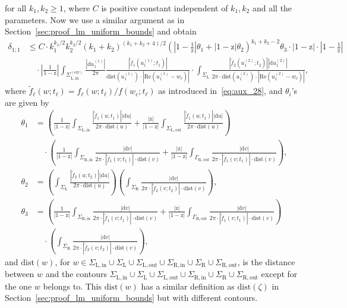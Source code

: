 \documentclass{article}
\numberwithin{equation}{section}
\newcommand{\dtt}{\text{dist}}
\newcommand{\exe}{\mathrm{err}}
\newcommand{\inn}{\mathrm{in}}
\newcommand{\LL}{\mathrm{L}}
\newcommand{\out}{\mathrm{out}}
\newcommand{\RR}{\mathrm{R}}
\begin{document}
for all $k_1,k_2\ge 1$, where $C$ is positive constant independent of  $k_1,k_2$ and all the parameters. Now we use a similar argument as in Section~\ref{sec:proof_lm_uniform_bounds} and obtain
\begin{equation}
	\label{eq:aux_29}
	\begin{split}
	\delta_{1;1}&\le C\cdot k_1^{k_1/2}k_2^{k_2/2}(k_1+k_2)^{(k_1+k_2+4)/2}\left(\left|1-\frac{1}{\mathrm{z}}\right|\theta_{1}+\left|1-\mathrm{z}\right|\theta_{2}\right)^{k_1+k_2-2} \theta_{3} \cdot |1-\mathrm{z}|\cdot\left|1-\frac{1}{\mathrm{z}}\right| \\
	&\quad\cdot \left|\frac{1}{1-\mathrm{z}}\right| \int_{\Sigma_{\LL,\inn}^{(\exe)}} 	    
	\frac{|\mathrm{d}u^{(1)}_{1}|}{2\pi} \frac{|\tilde f_1(u_1^{(1)};t_1)|}{\dtt(u_1^{(1)})\cdot |\mathrm{Re}(u_1^{(1)}-w_c)|}\cdot \int_{\Sigma_{\LL}} 	    
	\frac{|\tilde f_2(u^{(2)}_1;t_2)||\mathrm{d} u_1^{(2)}|}{2\pi\cdot \dtt(u_1^{(2)})\cdot |\mathrm{Re}(u_1^{(2)}-w_c)|},
	\end{split}
\end{equation}
where $\tilde f_\ell(w;t_\ell)=f_\ell(w;t_\ell)/f(w_c;t_\ell)$ as introduced in~\eqref{eq:aux_28}, and $\theta_i$'s are given by
\begin{equation*}
	\begin{split}
		\theta_{1}&=\left(  \frac{1}{|1-\mathrm{z}|} \int_{\Sigma_{\LL,\inn}} 	    
		\frac{|\tilde f_1(u;t_1)||\mathrm{d} u|}{2\pi\cdot \dtt(u)}   
		+\frac{\mathrm{|z|}}{|1-\mathrm{z}|} \int_{\Sigma_{\LL,\out}} \frac{|\tilde f_1(u;t_1)||\mathrm{d} u|}{2\pi\cdot \dtt(u)} 
		\right)\\
		&\quad\cdot\left(  \frac{1}{|1-\mathrm{z}|} \int_{\Sigma_{\RR,\inn}} 	    
		\frac{|\mathrm{d}v|}{2\pi\cdot |\tilde f_1(v;t_1)|\cdot \dtt(v)} 
		+\frac{\mathrm{|z|}}{|1-\mathrm{z}|} \int_{\Gamma_{\RR,\out}} \frac{|\mathrm{d} v|}{2\pi\cdot |\tilde f_1(v;t_1)|\cdot \dtt(v)}  
		\right),\\
		\theta_{2}&=\left(  \int_{\Sigma_{\LL}} 	    
		\frac{|\tilde f_2(u;t_2)||\mathrm{d} u|}{2\pi\cdot \dtt(u)}  	  
		\right)\left(\int_{\Sigma_{\RR}} 	    
		\frac{|\mathrm{d}v|}{2\pi\cdot |\tilde f_2(v;t_2)|\cdot \dtt(v)} 
		\right),\\
		\theta_{3}&=\left(  \frac{1}{|1-\mathrm{z}|} \int_{\Sigma_{\RR,\inn}} 	    
		\frac{|\mathrm{d}v|}{2\pi\cdot |\tilde f_1(v;t_1)|\cdot \dtt(v)} 
		+\frac{\mathrm{|z|}}{|1-\mathrm{z}|} \int_{\Gamma_{\RR,\out}} \frac{|\mathrm{d} v|}{2\pi\cdot |\tilde f_1(v;t_1)|\cdot \dtt(v)}  
		\right)\\
		&\quad\cdot \left(\int_{\Sigma_{\RR}} 	    
		\frac{|\mathrm{d}v|}{2\pi\cdot |\tilde f_2(v;t_2)|\cdot \dtt(v)} 
		\right),
	\end{split}
\end{equation*}
and $\dtt(w)$, for $w\in\Sigma_{\LL,\inn}\cup\Sigma_{\LL}\cup\Sigma_{\LL,\out}\cup\Sigma_{\RR,\inn}\cup\Sigma_{\RR}\cup\Sigma_{\RR,\out}$, is the distance between $w$ and the contours $\Sigma_{\LL,\inn}\cup\Sigma_{\LL}\cup\Sigma_{\LL,\out}\cup\Sigma_{\RR,\inn}\cup\Sigma_{\RR}\cup\Sigma_{\RR,\out}$ except for the one $w$ belongs to. This $\dtt(w)$ has a similar definition as $\dtt(\zeta)$ in Section~\ref{sec:proof_lm_uniform_bounds} but with different contours. 
\end{document}
